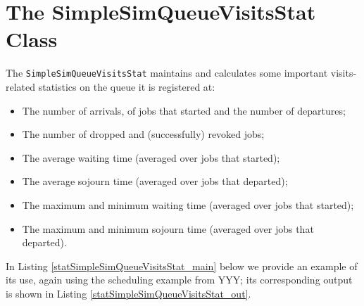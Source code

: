\documentclass[12pt]{book}
\begin{document}
\section{The SimpleSimQueueVisitsStat Class}
\label{stat-SimpleSimQueueVisitsStat}

The \lstinline|SimpleSimQueueVisitsStat| maintains and calculates some important
  visits-related statistics on the queue it is registered at:
\begin{itemize}
\item The number of arrivals, of jobs that started and the number of departures;
\item The number of dropped and (successfully) revoked jobs;
\item The average waiting time (averaged over jobs that started);
\item The average sojourn time (averaged over jobs that departed);
\item The maximum and minimum waiting time (averaged over jobs that started);
\item The maximum and minimum sojourn time (averaged over jobs that departed).
\end{itemize}
In Listing \ref{statSimpleSimQueueVisitsStat_main} below we provide an example of its use,
  again using the scheduling example from YYY;
  its corresponding output is shown in Listing
  \ref{statSimpleSimQueueVisitsStat_out}.
\end{document}
